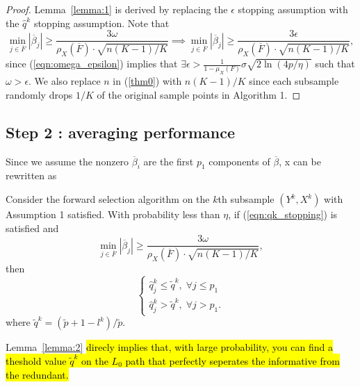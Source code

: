\documentclass[11pt,review,authoryear]{elsarticle}
\begin{document}
\begin{appendices}
\begin{proof}
  Lemma~\ref{lemma:1} is derived by replacing the $\epsilon$ stopping assumption with the $\widehat{q}^k$ stopping assumption. Note that
  \begin{displaymath}
    \min_{j\in\overline{F}}\left|\overline{\beta}_{j}\right|\geqslant\frac{3\omega}{\rho_{X}\left(\overline{F}\right)\cdot\sqrt{n\left(K-1\right)/K}} \implies \min_{j\in\overline{F}}\left|\overline{\beta}_{j}\right| \geqslant \frac{3\epsilon}{\rho_{X}\left(\overline{F}\right)\cdot\sqrt{n\left(K-1\right)/K}},
\end{displaymath}
since (\ref{eqn:omega_epsilon}) implies that $\exists \epsilon > \frac{1}{1-\mu_{X}\left(F\right)}\sigma\sqrt{2\ln\left(4p/\eta\right)}$ such that $\omega > \epsilon$.  We also replace $n$ in (\ref{thm0}) with $n\left(K-1\right)/K$ since each subsample randomly drops $1/K$ of the original sample points in Algorithm 1.
\end{proof}
\medskip


\subsection*{Step 2 : averaging performance}

Since we assume the nonzero $\overline{\beta}_i$ are the first $p_1$ components of $\overline{\beta}$, x can be rewritten as
%
\begin{lemma}
  Consider the forward selection algorithm on the $k$th subsample $\left(Y^{k},X^{k}\right)$ with Assumption 1 satisfied. With probability less than $\eta$, if (\ref{eqn:qk_stopping}) is satisfied and
  \[
      \min_{j\in\overline{F}}\left|\overline{\beta}_{j}\right|\geqslant\frac{3\omega}{\rho_{X}\left(\overline{F}\right)\cdot\sqrt{n\left(K-1\right)/K}},
  \]
  then
  \[
  \begin{cases}
      \widehat{q}_j^k \leqslant \widetilde{q}^k, \; \forall j\leqslant p_1\\
      \widehat{q}_j^k > \widetilde{q}^k, \; \forall j>p_1.
  \end{cases}
  \]
  where $\widetilde{q}^k = \left(\widetilde{p} + 1 - l^k\right) / \widetilde{p}$.
  \label{lemma:2}
\end{lemma}
%
\noindent
Lemma~\ref{lemma:2} \hl{direcly implies that, with large probability, you can find a theshold value $\widetilde{q}^k$ on the $L_0$ path that perfectly seperates the informative from the redundant.}


\end{appendices}
\end{document}
